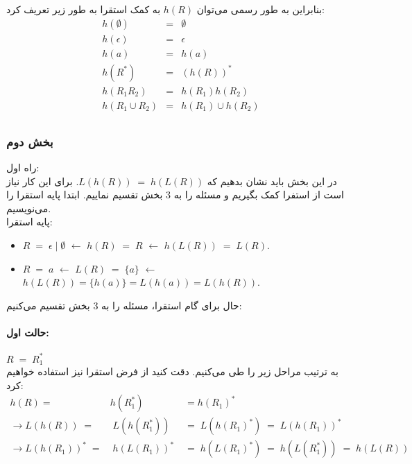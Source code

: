 بنابراین به طور رسمی می‌توان $h(R)$ به کمک استقرا به طور زیر تعریف کرد:
\begin{eqnarray*}
    h(\emptyset) &=& \emptyset \\
    h(\epsilon) &=& \epsilon \\
    h(a) &=& h(a) \\
    h(R^*) &=& (h(R))^* \\
    h(R_1R_2) &=& h(R_1)h(R_2) \\
    h(R_1 \cup R_2) &=& h(R_1)\cup h(R_2) \\[0.2in]
\end{eqnarray*}

\subsubsection*{بخش دوم}
راه اول:\\
در این بخش باید نشان بدهیم که 
$L(h(R)) \;=\; h(L(R))$.
برای این کار نیاز است از استفرا کمک بگیریم و مسئله را به 3 بخش تقسیم نماییم. ابتدا پایه استقرا را می‌نویسیم.\\[0.2in]
پایه استقرا: \newline
\begin{itemize}
    \item 
    $R\;=\; \epsilon \;|\; \emptyset$
    $\longleftarrow$ 
    $h(R)\;=\;R$
    $\longleftarrow$ 
    $h(L(R)) \;=\; L(R)$.\\

    \item 
    $R\;=\;a$
    $\longleftarrow$
    $L(R) \;=\; \{a\}$
    $\longleftarrow$
    $h(L(R)) = \{h(a)\} = L(h(a)) = L(h(R))$.\\[0.1in]
\end{itemize}
حال برای گام استقرا، مسئله را به 3 بخش تقسیم می‌کنیم:
\paragraph*{حالت اول:}
$R\;=\;R_1^*$\\[0.15in]
به ترتیب مراحل زیر را طی می‌کنیم. دقت کنید از فرض استقرا نیز استفاده خواهیم کرد:
\begin{eqnarray}
    h(R) =& h(R_1^*) &= h(R_1)^* \\
    \rightarrow 
    L(h(R))\;=&\;L(h(R_1^*))\;&=\;L(h(R_1)^*)\;=\;L(h(R_1))^* \\
    \rightarrow L(h(R_1))^*\;=&\;h(L(R_1))^*\;&=\;h(L(R_1)^*)\;=\;
    h(L(R_1^*))\;=\;h(L(R))
\end{eqnarray}

